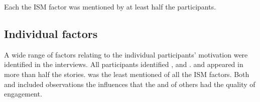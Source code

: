 Each the ISM factor was mentioned by at least half the participants.

\subsection{Individual factors}\label{sec:resindividual}

A wide range of factors relating to the individual participants' motivation were identified in the interviews. All participants identified \ismiv, \ismia{} and \ismis.  \ismiv{} and \ismia{} appeared in more than half the stories. \ismic{} was the least mentioned of all the ISM factors. Both \ismis{} and \ismih{} included observations the influences that the \ismis{} and \ismih{} of others had the quality of engagement.

\subsubsection{\ismiv}\label{sec:resismvalues}

